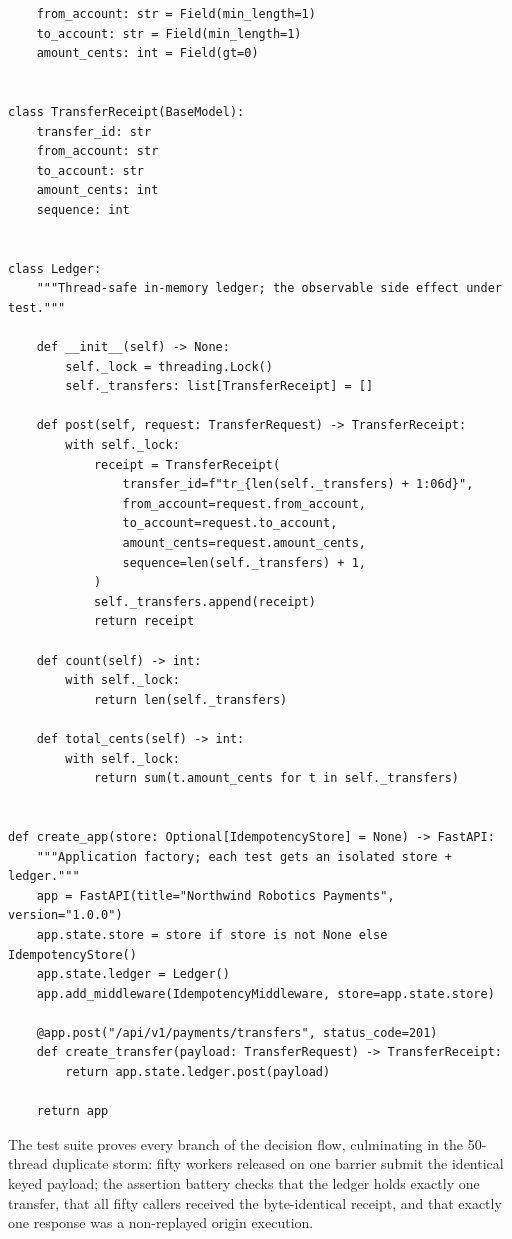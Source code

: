 \begin{verbatim}
    from_account: str = Field(min_length=1)
    to_account: str = Field(min_length=1)
    amount_cents: int = Field(gt=0)


class TransferReceipt(BaseModel):
    transfer_id: str
    from_account: str
    to_account: str
    amount_cents: int
    sequence: int


class Ledger:
    """Thread-safe in-memory ledger; the observable side effect under test."""

    def __init__(self) -> None:
        self._lock = threading.Lock()
        self._transfers: list[TransferReceipt] = []

    def post(self, request: TransferRequest) -> TransferReceipt:
        with self._lock:
            receipt = TransferReceipt(
                transfer_id=f"tr_{len(self._transfers) + 1:06d}",
                from_account=request.from_account,
                to_account=request.to_account,
                amount_cents=request.amount_cents,
                sequence=len(self._transfers) + 1,
            )
            self._transfers.append(receipt)
            return receipt

    def count(self) -> int:
        with self._lock:
            return len(self._transfers)

    def total_cents(self) -> int:
        with self._lock:
            return sum(t.amount_cents for t in self._transfers)


def create_app(store: Optional[IdempotencyStore] = None) -> FastAPI:
    """Application factory; each test gets an isolated store + ledger."""
    app = FastAPI(title="Northwind Robotics Payments", version="1.0.0")
    app.state.store = store if store is not None else IdempotencyStore()
    app.state.ledger = Ledger()
    app.add_middleware(IdempotencyMiddleware, store=app.state.store)

    @app.post("/api/v1/payments/transfers", status_code=201)
    def create_transfer(payload: TransferRequest) -> TransferReceipt:
        return app.state.ledger.post(payload)

    return app
\end{verbatim}

The test suite proves every branch of the decision flow, culminating in the
50-thread duplicate storm: fifty workers released on one barrier submit the
identical keyed payload; the assertion battery checks that the ledger holds
exactly one transfer, that all fifty callers received the byte-identical
receipt, and that exactly one response was a non-replayed origin execution.


